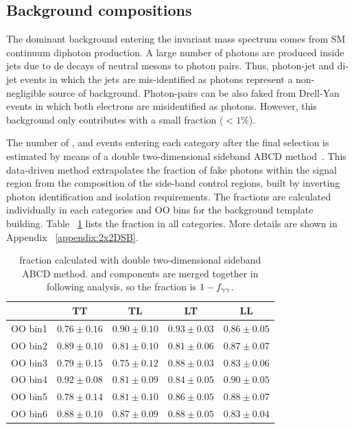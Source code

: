 \subsection{Background compositions}
\label{ssec:bkg_composition}

The dominant background entering the invariant mass spectrum comes from SM continuum diphoton production. A large number of photons are produced inside jets due to de decays of neutral mesons to photon pairs. Thus, photon-jet and di-jet events in which the jets are mis-identified as photons represent a non-negligible source of background. Photon-pairs can be also faked from Drell-Yan events in which both electrons are misidentified as photons. However, this background only contributes with a small fraction ($<1\%$).

The number of \yy, \yjet and \jetjet events entering each category after the final selection is estimated by means of a double two-dimensional sideband ABCD method~\cite{ATL-COM-PHYS-2012-592}. This data-driven method extrapolates the fraction of fake photons within the signal region from the composition of the side-band control regions, built by inverting photon identification and isolation requirements. The fractions are calculated individually in each categories and OO bins for the background template building. Table ~\ref{tab:yyfraction} lists the \yy fraction in all categories. More details are shown in Appendix ~\ref{appendix:2x2DSB}. 

\begin{table}[htbp]
  \centering
  \begin{tabular}{c|cccc}
  \toprule
           &  TT  &  TL  &  LT  &  LL  \\ 
  \toprule
  OO bin1  & $0.76 \pm 0.16$ & $0.90 \pm 0.10$ & $0.93 \pm 0.03$ & $0.86 \pm 0.05$ \\ \hline
  OO bin2  & $0.89 \pm 0.10$ & $0.81 \pm 0.10$ & $0.81 \pm 0.06$ & $0.87 \pm 0.07$ \\ \hline
  OO bin3  & $0.79 \pm 0.15$ & $0.75 \pm 0.12$ & $0.88 \pm 0.03$ & $0.83 \pm 0.06$ \\ \hline
  OO bin4  & $0.92 \pm 0.08$ & $0.81 \pm 0.09$ & $0.84 \pm 0.05$ & $0.90 \pm 0.05$ \\ \hline
  OO bin5  & $0.78 \pm 0.14$ & $0.81 \pm 0.10$ & $0.86 \pm 0.05$ & $0.88 \pm 0.07$ \\ \hline
  OO bin6  & $0.88 \pm 0.10$ & $0.87 \pm 0.09$ & $0.88 \pm 0.05$ & $0.83 \pm 0.04$ \\
  \bottomrule
  \end{tabular}
  \caption{\yy fraction calculated with double two-dimensional sideband ABCD method. \yjet and \jetjet components are merged together in following analysis, so the fraction is $1-f_{\gamma\gamma}$. }
  \label{tab:yyfraction}
\end{table}

